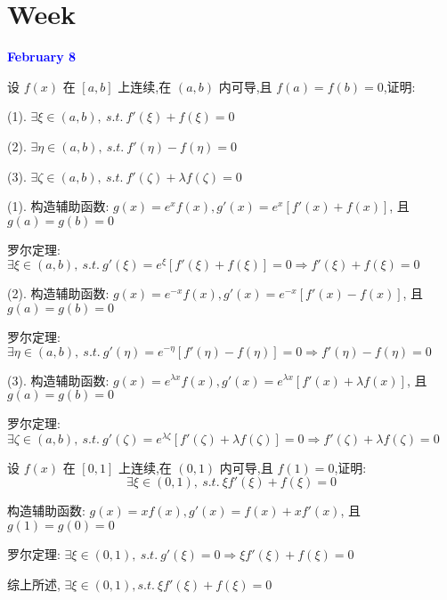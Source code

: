 \section{Week }
\textcolor{blue}{\textbf{February 8}}

\begin{example}[][Exam: 28.2.1]
	设 $f(x)$ 在 $[a,b]$ 上连续,在 $(a,b)$ 内可导,且 $f(a)=f(b)=0$,证明:

(1). $\exists \xi\in(a,b),\ s.t.\ f'(\xi)+f(\xi)=0$

(2). $\exists \eta\in(a,b),\ s.t.\ f'(\eta)-f(\eta)=0$

(3). $\exists \zeta\in(a,b),\ s.t.\ f'(\zeta)+\lambda f(\zeta)=0$
\end{example}

\begin{solution}

	(1). 构造辅助函数: $g(x) = e^{x}f(x), g'(x) = e^{x}\left[f'(x) + f(x)\right]$, 且 $g(a) = g(b) = 0$

	罗尔定理: $\exists \xi\in(a,b),\ s.t.\ g'(\xi) = e^{\xi}\left[f'(\xi) + f(\xi)\right] = 0\Rightarrow f'(\xi) + f(\xi) = 0$

	

	(2). 构造辅助函数: $g(x) = e^{-x}f(x), g'(x) = e^{-x}\left[f'(x) - f(x)\right]$, 且 $g(a) = g(b) = 0$

	罗尔定理: $\exists \eta\in(a,b),\ s.t.\ g'(\eta) = e^{-\eta}\left[f'(\eta) - f(\eta)\right] = 0\Rightarrow f'(\eta) - f(\eta) = 0$

	

	(3). 构造辅助函数: $g(x) = e^{\lambda x}f(x), g'(x) = e^{\lambda x}\left[f'(x) + \lambda f(x)\right]$, 且 $g(a) = g(b) = 0$

	罗尔定理: $\exists \zeta\in(a,b),\ s.t.\ g'(\zeta) = e^{\lambda\zeta}\left[f'(\zeta) + \lambda f(\zeta)\right] = 0\Rightarrow f'(\zeta) + \lambda f(\zeta) = 0$
\end{solution}

\begin{example}[][Exam: 28.2.2]
	设 $f(x)$ 在 $[0,1]$ 上连续,在 $(0,1)$ 内可导,且 $f(1)=0$,证明:
	$$\exists \xi\in(0,1),\ s.t.\ \xi f'(\xi) + f(\xi) = 0$$
\end{example}

\begin{solution}

	构造辅助函数: $g(x) = xf(x), g'(x) = f(x) +xf'(x)$, 且 $g(1) = g(0) = 0$

	罗尔定理: $\exists \xi\in(0,1),\ s.t.\ g'(\xi) = 0\Rightarrow \xi f'(\xi) + f(\xi) = 0$

	综上所述, $\exists \xi\in(0,1),s.t.\ \xi f'(\xi) + f(\xi) = 0$
\end{solution}

